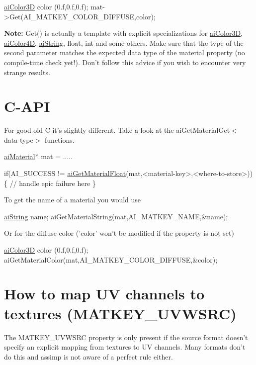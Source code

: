 \begin{DoxyCode}
\hyperlink{structai_color3_d}{aiColor3D} color (0.f,0.f,0.f);
mat->Get(AI\_MATKEY\_COLOR\_DIFFUSE,color);
\end{DoxyCode}


{\bfseries Note\+:} Get() is actually a template with explicit specializations for \hyperlink{structai_color3_d}{ai\+Color3\+D}, \hyperlink{structai_color4_d}{ai\+Color4\+D}, \hyperlink{structai_string}{ai\+String}, float, int and some others. Make sure that the type of the second parameter matches the expected data type of the material property (no compile-\/time check yet!). Don't follow this advice if you wish to encounter very strange results.\hypertarget{materials_C}{}\section{C-\/\+A\+P\+I}\label{materials_C}
For good old C it's slightly different. Take a look at the ai\+Get\+Material\+Get$<$data-\/type$>$ functions.


\begin{DoxyCode}
\hyperlink{classai_material}{aiMaterial}* mat = .....

if(AI\_SUCCESS != \hyperlink{namespaceassimp_1_1api_a2c26953d3d9bd2ac94f7cc060f2bd859}{aiGetMaterialFloat}(mat,<material-key>,<where-to-store>)) \{
   \textcolor{comment}{// handle epic failure here}
\}
\end{DoxyCode}


To get the name of a material you would use


\begin{DoxyCode}
\hyperlink{structai_string}{aiString} name;
aiGetMaterialString(mat,AI\_MATKEY\_NAME,&name);
\end{DoxyCode}


Or for the diffuse color ('color' won't be modified if the property is not set)


\begin{DoxyCode}
\hyperlink{structai_color3_d}{aiColor3D} color (0.f,0.f,0.f);
aiGetMaterialColor(mat,AI\_MATKEY\_COLOR\_DIFFUSE,&color);
\end{DoxyCode}
\hypertarget{materials_uvwsrc}{}\section{How to map U\+V channels to textures (\+M\+A\+T\+K\+E\+Y\+\_\+\+U\+V\+W\+S\+R\+C)}\label{materials_uvwsrc}
The M\+A\+T\+K\+E\+Y\+\_\+\+U\+V\+W\+S\+R\+C property is only present if the source format doesn't specify an explicit mapping from textures to U\+V channels. Many formats don't do this and assimp is not aware of a perfect rule either.

